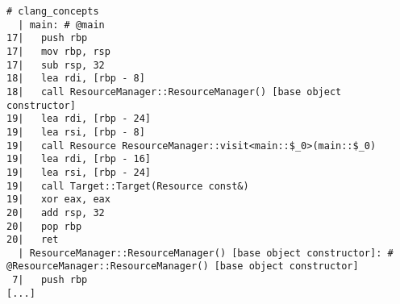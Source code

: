 \begin{lstlisting}[language={},numbers=none,title=\href{https://godbolt.org/z/FglFcp}{\texttt{godbolt.org/z/FglFcp}}]
# clang_concepts 
  | main: # @main
17|   push rbp
17|   mov rbp, rsp
17|   sub rsp, 32
18|   lea rdi, [rbp - 8]
18|   call ResourceManager::ResourceManager() [base object constructor]
19|   lea rdi, [rbp - 24]
19|   lea rsi, [rbp - 8]
19|   call Resource ResourceManager::visit<main::$_0>(main::$_0)
19|   lea rdi, [rbp - 16]
19|   lea rsi, [rbp - 24]
19|   call Target::Target(Resource const&)
19|   xor eax, eax
20|   add rsp, 32
20|   pop rbp
20|   ret
  | ResourceManager::ResourceManager() [base object constructor]: # @ResourceManager::ResourceManager() [base object constructor]
 7|   push rbp
[...]
\end{lstlisting}
